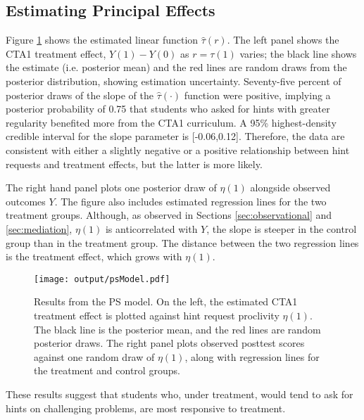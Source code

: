 \documentclass{article}\usepackage[]{graphicx}\usepackage[]{color}
\begin{document}
\subsection{Estimating Principal Effects}\label{sec:PSest}

Figure \ref{fig:psResults} shows the estimated linear function
$\hat{\tau}(r)$.
The left panel shows the CTA1 treatment effect, $Y(1)-Y(0)$ as
$r=\tau(1)$ varies; the black line shows the estimate (i.e. posterior
mean) and the red lines are random draws from the posterior
distribution, showing estimation uncertainty.
Seventy-five percent of posterior draws of the slope of the
$\hat{\tau}(\cdot)$ function were positive, implying a posterior
probability of 0.75
that students who asked for hints
with greater regularity benefited more from the CTA1 curriculum.
A 95\% highest-density credible interval for the slope parameter is
[-0.06,0.12].
Therefore, the data are consistent with either a slightly negative or
a positive relationship between hint requests and treatment
effects, but the latter is more likely.

The right hand panel plots one posterior draw of $\eta(1)$
alongside observed outcomes $Y$.
The figure also includes estimated regression lines for the two
treatment groups.
Although, as observed in Sections \ref{sec:observational} and
\ref{sec:mediation}, $\eta(1)$ is anticorrelated with $Y$, the slope
is steeper in the control group than in the treatment group.
The distance between the two regression lines is the treatment effect,
which grows with $\eta(1)$.

\begin{figure}
\centering
\texttt{[image: output/psModel.pdf]}
\caption{Results from the PS model. On the left, the estimated
  CTA1 treatment effect is plotted against hint request proclivity
  $\eta(1)$. The black line is the posterior mean, and the red lines
  are random posterior draws. The right panel plots observed posttest
  scores against one random draw of $\eta(1)$, along with regression
  lines for the treatment and control groups.}
\label{fig:psResults}
\end{figure}

These results suggest that students who, under treatment, would tend
to ask for hints on challenging problems, are most responsive to
treatment.
\end{document}
